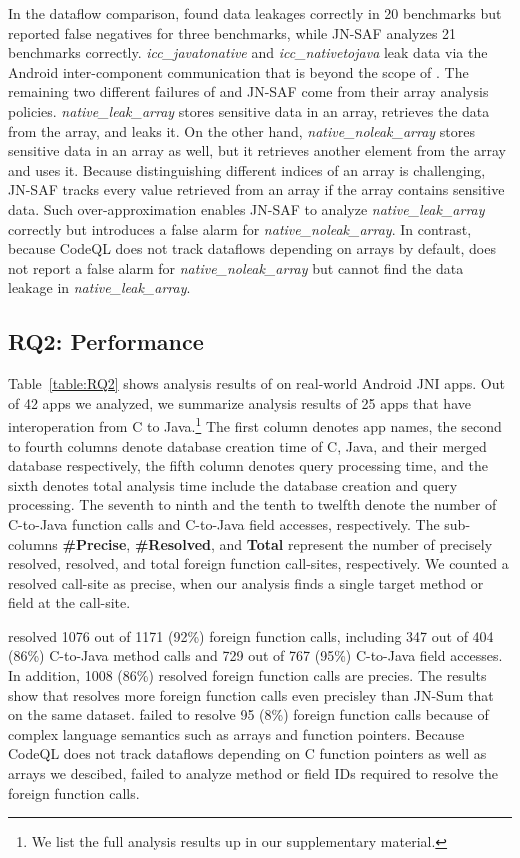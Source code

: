 In the dataflow comparison, \ours found data leakages correctly in 20
benchmarks but reported false negatives for three benchmarks, while JN-SAF
analyzes 21 benchmarks correctly. 
{\it icc\_javatonative} and {\it icc\_nativetojava} leak data via the Android
inter-component communication that is beyond the scope of \ours.
The remaining two different failures of \ours and JN-SAF come from their array analysis policies.
{\it native\_leak\_array} stores sensitive data in an array, retrieves the data from the array,
and leaks it.  On the other hand, {\it native\_noleak\_array} stores sensitive
data in an array as well, but it retrieves another element from the array and uses it.
Because distinguishing different indices of an array is challenging, JN-SAF
tracks every value retrieved from an array if the array contains sensitive data.
Such over-approximation enables JN-SAF to analyze {\it
native\_leak\_array} correctly but introduces a false alarm for {\it
native\_noleak\_array}.  In contrast, because CodeQL does not
track dataflows depending on arrays by default, \ours does not report
a false alarm for {\it native\_noleak\_array} but cannot find the data leakage in {\it
native\_leak\_array}.


\subsection{RQ2: Performance}
Table~\ref{table:RQ2} shows analysis results of \ours on real-world Android
JNI apps. Out of 42 apps we analyzed, we summarize analysis
results of 25 apps that have interoperation from C to Java.\footnote{We
list the full analysis results up in our supplementary material.} The first
column denotes app names, the second to fourth columns denote database
creation time of C, Java, and their merged database respectively, the fifth
column denotes query processing time, and the sixth denotes total analysis time
include the database creation and query processing. The seventh to ninth and
the tenth to twelfth denote the number of C-to-Java function calls and
C-to-Java field accesses, respectively. The sub-columns {\bf \#Precise}, {\bf
\#Resolved}, and {\bf Total} represent the number of precisely resolved,
resolved, and total foreign function call-sites, respectively. We counted a
resolved call-site as precise, when our analysis finds a single target method
or field at the call-site.


\ours resolved 1076 out of 1171 (92\%) foreign function calls, including
347 out of 404 (86\%) C-to-Java method calls and 729 out of 767 (95\%)
C-to-Java field accesses. In addition, 1008 (86\%) resolved foreign function
calls are precies. The results show that \ours resolves more foreign
function calls even precisley than JN-Sum that  on the same
dataset. \ours failed to resolve 95 (8\%) foreign function calls because
of complex language semantics such as arrays and function pointers. Because
CodeQL does not track dataflows depending on C function pointers as well as
arrays we descibed, \ours failed to analyze method or field IDs required
to resolve the foreign function calls.


